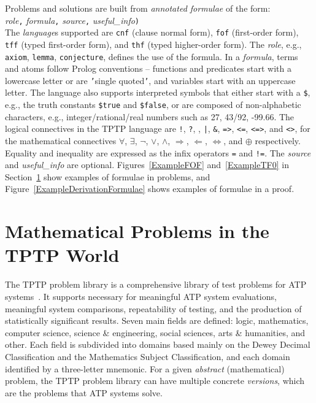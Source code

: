 \documentclass[runningheads]{llncs}
\newcommand{\smalltt}[1]{\small \texttt{#1}}
\begin{document}
Problems and solutions are built from {\em annotated formulae} of the form: \\
{\em role}{\tt ,}
{\em formula}{\tt ,}
{\em source}{\tt ,}
{\em useful\_info}{\tt )}\\
The {\em language}s supported are {\smalltt{cnf}} (clause normal form), {\smalltt{fof}}
(first-order form), {\smalltt{tff}} (typed first-order form), and {\smalltt{thf}}
(typed higher-order form).
The {\em role}, e.g., {\smalltt{axiom}}, {\smalltt{lemma}}, {\smalltt{conjecture}}, defines the 
use of the formula.
In a {\em formula}, terms and atoms follow Prolog conventions -- functions and predicates start 
with a lowercase letter or are {\tt '}single quoted{\tt '}, and variables start with an uppercase 
letter.
The language also supports interpreted symbols that either start with a {\tt \$}, e.g., the 
truth constants {\smalltt{\$true}} and {\smalltt{\$false}}, or are composed of 
non-alphabetic characters, e.g., integer/rational/real numbers such as 27, 43/92, -99.66.
The logical connectives in the TPTP language are
{\tt !}, {\tt ?}, {\tt {\raisebox{0.4ex}{\texttildelow}}}, {\tt |}, {\tt \&}, {\tt =>}, {\tt <=},
{\tt <=>}, and {\tt <{\raisebox{0.4ex}{\texttildelow}}>},
for the mathematical connectives
$\forall$, $\exists$, $\neg$, $\vee$, $\wedge$, $\Rightarrow$, $\Leftarrow$, $\Leftrightarrow$, 
and $\oplus$ respectively.
Equality and inequality are expressed as the infix operators {\tt =} and {\tt !=}.
The {\em source} and {\em useful\_info} are optional.
Figures~\ref{ExampleFOF} and~\ref{ExampleTF0} in Section~\ref{TPTP} show examples of formulae in
problems, and Figure~\ref{ExampleDerivationFormulae} shows examples of formulae in a proof.

\section{Mathematical Problems in the TPTP World}
\label{TPTP}

The TPTP problem library is a comprehensive library of test problems for ATP systems~\cite{Sut09}.
It supports necessary for meaningful ATP system evaluations, meaningful system comparisons, 
repeatability of testing, and the production of statistically significant results. 
Seven main fields are defined: logic, mathematics, computer science, science \& engineering, 
social sciences, arts \& humanities, and other. 
Each field is subdivided into domains based mainly on the Dewey Decimal Classification and the 
Mathematics Subject Classification, and each domain identified by a three-letter mnemonic.
For a given {\em abstract} (mathematical) problem, the TPTP problem library can have multiple 
concrete {\em versions}, which are the problems that ATP systems solve. 
\end{document}
